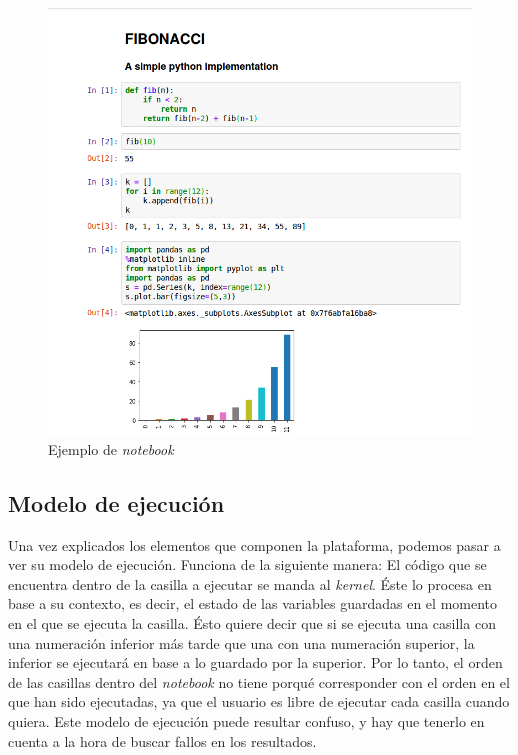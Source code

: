 \documentclass[11pt,spanish,listoffigures,listoftables]{tfgetsinf}
\begin{document}
\begin{figure}[H]
	\centering
  	\includegraphics[width=\linewidth]{notebook.png}
  	\caption{Ejemplo de \textit{notebook}}
  	\label{fig:notebook}
\end{figure}


\subsection{Modelo de ejecución}
\label{subsec:modelo-ejec}

Una vez explicados los elementos que componen la plataforma, podemos pasar a ver su modelo de ejecución. Funciona de la siguiente manera: El código que se encuentra dentro de la casilla a ejecutar se manda al \textit{kernel}. Éste lo procesa en base a su contexto, es decir, el estado de las variables guardadas en el momento en el que se ejecuta la casilla. Ésto quiere decir que si se ejecuta una casilla con una numeración inferior más tarde que una con una numeración superior, la inferior se ejecutará en base a lo guardado por la superior. Por lo tanto, el orden de las casillas dentro del \textit{notebook} no tiene porqué corresponder con el orden en el que han sido ejecutadas, ya que el usuario es libre de ejecutar cada casilla cuando quiera. Este modelo de ejecución puede resultar confuso, y hay que tenerlo en cuenta a la hora de buscar fallos en los resultados.
\end{document}
